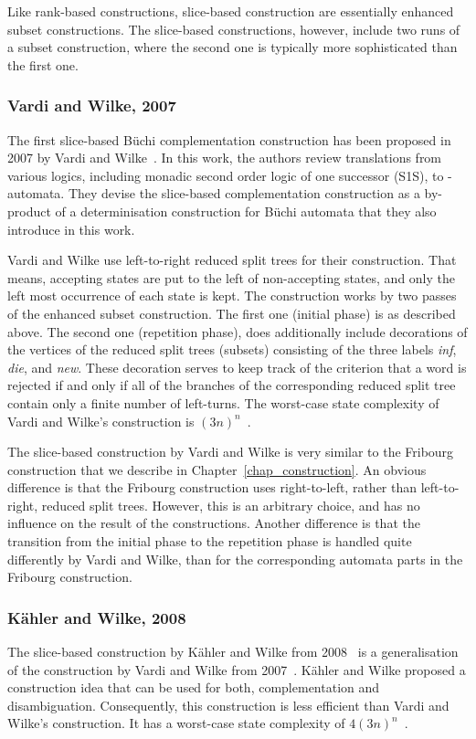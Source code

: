 Like rank-based constructions, slice-based construction are essentially enhanced subset constructions. The slice-based constructions, however, include two runs of a subset construction, where the second one is typically more sophisticated than the first one.


\subsubsection{Vardi and Wilke, 2007}
\label{2_vw07}
The first slice-based Büchi complementation construction has been proposed in 2007 by Vardi and Wilke~\cite{vardi2007automata}. In this work, the authors review translations from various logics, including monadic second order logic of one successor (S1S), to \om-automata. They devise the slice-based complementation construction as a by-product of a determinisation construction for Büchi automata that they also introduce in this work.

Vardi and Wilke use left-to-right reduced split trees for their construction. That means, accepting states are put to the left of non-accepting states, and only the left most occurrence of each state is kept. The construction works by two passes of the enhanced subset construction. The first one (initial phase) is as described above. The second one (repetition phase), does additionally include decorations of the vertices of the reduced split trees (subsets) consisting of the three labels \textit{inf}, \textit{die}, and \textit{new}. These decoration serves to keep track of the criterion that a word is rejected if and only if all of the branches of the corresponding reduced split tree contain only a finite number of left-turns. The worst-case state complexity of Vardi and Wilke's construction is $(3n)^n$~\cite{vardi2007automata}.

The slice-based construction by Vardi and Wilke is very similar to the Fribourg construction that we describe in Chapter~\ref{chap_construction}. An obvious difference is that the Fribourg construction uses right-to-left, rather than left-to-right, reduced split trees. However, this is an arbitrary choice, and has no influence on the result of the constructions. Another difference is that the transition from the initial phase to the repetition phase is handled quite differently by Vardi and Wilke, than for the corresponding automata parts in the Fribourg construction.

\subsubsection{Kähler and Wilke, 2008}
\label{2_kw08}
The slice-based construction by Kähler and Wilke from 2008~\cite{2008_kaehler} is a generalisation of the construction by Vardi and Wilke from 2007~\cite{vardi2007automata}. Kähler and Wilke proposed a construction idea that can be used for both, complementation and disambiguation. Consequently, this construction is less efficient than Vardi and Wilke's construction. It has a worst-case state complexity of $4(3n)^n$~\cite{2011_tsai}.

